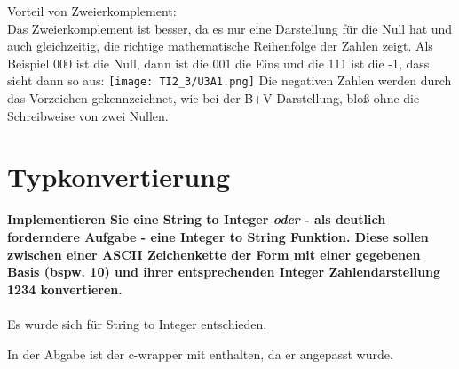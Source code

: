 \documentclass[11pt]{article}
\newcommand{\aufgabe}[1]{\item{\bf #1}}
\begin{document}
Vorteil von Zweierkomplement:\\
Das Zweierkomplement ist besser, da es nur eine Darstellung für die Null hat und auch gleichzeitig, die richtige mathematische Reihenfolge der Zahlen zeigt. Als Beispiel 000 ist die Null, dann ist die 001 die Eins und die 111 ist die -1, dass sieht dann so aus:
\texttt{[image: TI2\_3/U3A1.png]}
Die negativen Zahlen werden durch das Vorzeichen gekennzeichnet, wie bei der B+V Darstellung, bloß ohne die Schreibweise von zwei Nullen.
\section{Typkonvertierung}
\aufgabe{Implementieren Sie eine \glqq String to Integer\grqq{} \textit{oder} - als deutlich forderndere Aufgabe - eine \glqq Integer to String\grqq{} Funktion. Diese sollen zwischen einer ASCII Zeichenkette der Form \glqq 1234\grqq{} mit einer gegebenen Basis (bspw. 10) und ihrer entsprechenden Integer Zahlendarstellung 1234 konvertieren.}
\\
\\
Es wurde sich für \glqq String to Integer\grqq{} entschieden.



In der Abgabe ist der c-wrapper mit enthalten, da er angepasst wurde. 
\end{document}
